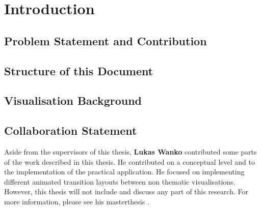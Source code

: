 \section{Introduction}


\subsection{Problem Statement and Contribution}

\subsection{Structure of this Document}

\subsection{Visualisation Background}


\subsection{Collaboration Statement}
\label{s:collaboration-statement}
Aside from the supervisors of this thesis, \textbf{Lukas Wanko} contributed some parts of the work described in this thesis. He contributed on a conceptual level and to the implementation of the practical application. He focused on implementing different animated transition layouts between non thematic visualisations. However, this thesis will not include and discuss any part of this research. For more information, please see his masterthesis .